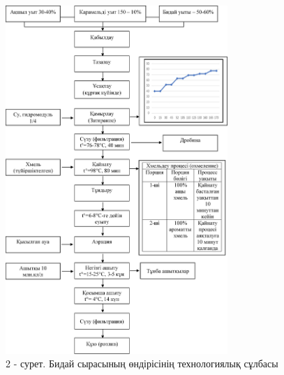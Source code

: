 \begin{figure}[H]
	\centering
	\includegraphics[width=0.75\textwidth]{media/pish3/image5}
	\caption*{2 - сурет. Бидай сырасының өндірісінің технологиялық сұлбасы}
\end{figure}


